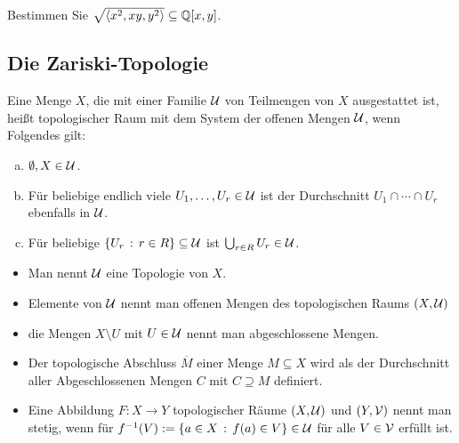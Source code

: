 \documentclass[11pt]{article}
\numberwithin{equation}{section}
\begin{document}
\begin{aufgabe}
	Bestimmen Sie $\sqrt{ \left< x^2, x y, y^2 \right> } \subseteq \mathbb{Q}[x,y]$. 
\end{aufgabe} 

\subsection{Die Zariski-Topologie}


\begin{definition}
	Eine Menge $X$, die mit einer Familie $\mathcal{U}$ von Teilmengen von $X$ ausgestattet ist, heißt topologischer Raum mit dem System der offenen Mengen $\mathcal{U}$, wenn Folgendes gilt: 
	\begin{enumerate}[(a)]
		\item $\emptyset, X \in \mathcal{U}$. 
		\item Für beliebige endlich viele $U_1,\ldots,U_r \in \mathcal{U}$ ist der Durchschnitt $U_1 \cap \cdots \cap U_r$ ebenfalls in $\mathcal{U}$. 
		\item Für beliebige $\left\{  U_r  \,:\, r \in R \right\} \subseteq \mathcal{U}$ ist $\bigcup_{r \in R} U_r \in \mathcal{U}$. 
	\end{enumerate}
	\begin{itemize} 
		\item Man nennt $\mathcal{U}$  eine Topologie von $X$. 
		\item Elemente von $\mathcal{U}$ nennt man offenen Mengen des topologischen Raums $(X,\mathcal{U})$  
		\item die Mengen $X \setminus  U$ mit $U \in \mathcal{U}$ nennt man abgeschlossene Mengen. 
		\item Der topologische Abschluss $\overline{M}$ einer Menge $M \subseteq X$ wird als der Durchschnitt aller Abgeschlossenen Mengen $C$ mit $C \supseteq M$ definiert. 
		\item Eine Abbildung $ F : X \to Y$ topologischer Räume $(X,\mathcal{U})$ und $(Y,\mathcal{V})$ nennt man stetig, wenn für $f^{-1}( V) := \left\{  a \in X \,:\, f(a) \in V \right\} \in \mathcal{U}$ für alle $V \in \mathcal{V}$ erfüllt ist.  
	\end{itemize} 
\end{definition} 
\end{document}
